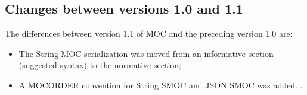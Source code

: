 \documentclass[11pt,a4paper]{ivoa}
\begin{document}
\subsection{Changes between versions 1.0 and 1.1}
The differences between version 1.1 of MOC and the preceding version
1.0 are:
\begin{itemize}
   \item The String MOC serialization was moved from an informative
     section (suggested syntax) to the normative section;
   \item A MOCORDER convention for String SMOC and JSON SMOC was added.
     \citep{2020arXiv200707519D}.
\end{itemize}



\end{document}
